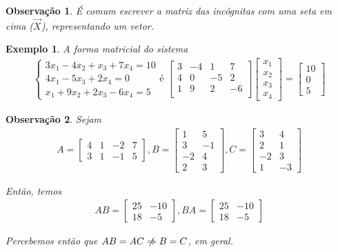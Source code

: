\documentclass{article}
\newtheorem*{remark}{Observação}
\newtheorem*{example}{Exemplo}
\begin{document}
\begin{remark}
	É comum escrever a matriz das incógnitas com uma seta em cima ($\displaystyle{\vec{X}}$), representando um vetor.
\end{remark}

\begin{example}
	A forma matricial do sistema
	\begin{align*}
	\begin{cases}
	3x_1 - 4x_2 + x_3 + 7x_4 = 10 \\
	4x_1 - 5x_3 + 2x_4 = 0 \\
	x_1 + 9x_2 + 2x_3 - 6x_4 = 5
	\end{cases} \text{é  }
	\begin{bmatrix}
	3 & -4 & 1 & 7 \\
	4 & 0 & -5 & 2 \\
	1 & 9 & 2 & -6 \\
	\end{bmatrix}\begin{bmatrix}
	x_1 \\
	x_2 \\
	x_3 \\
	x_4
	\end{bmatrix} = \begin{bmatrix}
	10 \\
	0 \\
	5
	\end{bmatrix}
	\end{align*}
\end{example}

\begin{remark}
	Sejam
	\begin{align*}
	A = \begin{bmatrix}
	4 & 1 & -2 & 7 \\
	3 & 1 & -1 & 5 
	\end{bmatrix}, B = \begin{bmatrix}
	1 & 5 \\ 
	3 & -1 \\
	-2 & 4 \\
	2 & 3
	\end{bmatrix}, C = \begin{bmatrix}
	3 & 4 \\
	2 & 1 \\
	-2 & 3 \\
	1 & -3
	\end{bmatrix}
	\end{align*}
	\par\vspace{0.3cm} Então, temos
	\begin{align*}
	AB = \begin{bmatrix}
	25 & -10 \\
	18 & -5
	\end{bmatrix}, BA = \begin{bmatrix}
	25 & -10 \\
	18 & -5
	\end{bmatrix}
	\end{align*}
	\par\vspace{0.3cm} Percebemos então que $AB = AC\centernot\Rightarrow B = C$, em geral.
\end{remark}
\end{document}
